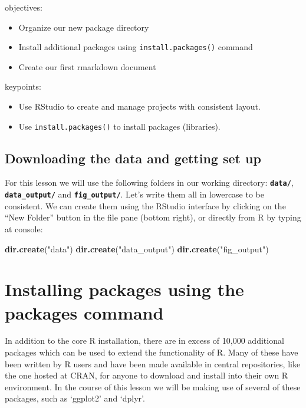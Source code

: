 \documentclass[]{book}
\newenvironment{Shaded}{\begin{snugshade}}{\end{snugshade}}
\newcommand{\KeywordTok}[1]{\textcolor[rgb]{0.13,0.29,0.53}{\textbf{#1}}}
\newcommand{\StringTok}[1]{\textcolor[rgb]{0.31,0.60,0.02}{#1}}
\newcommand{\NormalTok}[1]{#1}
\providecommand{\tightlist}{%
  \setlength{\itemsep}{0pt}\setlength{\parskip}{0pt}}
\begin{document}
objectives:

\begin{itemize}
\tightlist
\item
  Organize our new package directory
\item
  Install additional packages using \texttt{install.packages()} command
\item
  Create our first rmarkdown document
\end{itemize}

keypoints:

\begin{itemize}
\tightlist
\item
  Use RStudio to create and manage projects with consistent layout.\\
\item
  Use \texttt{install.packages()} to install packages (libraries).
\end{itemize}

\subsection{Downloading the data and getting set
up}\label{downloading-the-data-and-getting-set-up}

For this lesson we will use the following folders in our working
directory: \textbf{\texttt{data/}}, \textbf{\texttt{data\_output/}} and
\textbf{\texttt{fig\_output/}}. Let's write them all in lowercase to be
consistent. We can create them using the RStudio interface by clicking
on the ``New Folder'' button in the file pane (bottom right), or
directly from R by typing at console:

\begin{Shaded}
\begin{Highlighting}[]
\KeywordTok{dir.create}\NormalTok{(}\StringTok{"data"}\NormalTok{)}
\KeywordTok{dir.create}\NormalTok{(}\StringTok{"data_output"}\NormalTok{)}
\KeywordTok{dir.create}\NormalTok{(}\StringTok{"fig_output"}\NormalTok{)}
\end{Highlighting}
\end{Shaded}

\section{Installing packages using the packages
command}\label{installing-packages-using-the-packages-command}

In addition to the core R installation, there are in excess of 10,000
additional packages which can be used to extend the functionality of R.
Many of these have been written by R users and have been made available
in central repositories, like the one hosted at CRAN, for anyone to
download and install into their own R environment. In the course of this
lesson we will be making use of several of these packages, such as
`ggplot2' and `dplyr'.
\end{document}
